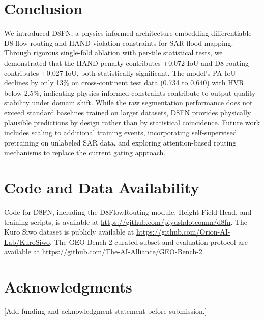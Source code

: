 \documentclass[journal]{IEEEtran}
\begin{document}
\section{Conclusion}
We introduced D8FN, a physics-informed architecture embedding differentiable D8 flow routing and HAND violation constraints for SAR flood mapping. Through rigorous single-fold ablation with per-tile statistical tests, we demonstrated that the HAND penalty contributes +0.072 IoU and D8 routing contributes +0.027 IoU, both statistically significant. The model's PA-IoU declines by only 13\% on cross-continent test data (0.734 to 0.640) with HVR below 2.5\%, indicating physics-informed constraints contribute to output quality stability under domain shift. While the raw segmentation performance does not exceed standard baselines trained on larger datasets, D8FN provides physically plausible predictions by design rather than by statistical coincidence. Future work includes scaling to additional training events, incorporating self-supervised pretraining on unlabeled SAR data, and exploring attention-based routing mechanisms to replace the current gating approach.

\section*{Code and Data Availability}
Code for D8FN, including the D8FlowRouting module, Height Field Head, and training scripts, is available at \url{https://github.com/piyushdotcomm/d8fn}. The Kuro Siwo dataset is publicly available at \url{https://github.com/Orion-AI-Lab/KuroSiwo}. The GEO-Bench-2 curated subset and evaluation protocol are available at \url{https://github.com/The-AI-Alliance/GEO-Bench-2}.

\section*{Acknowledgments}
[Add funding and acknowledgment statement before submission.]



\end{document}
